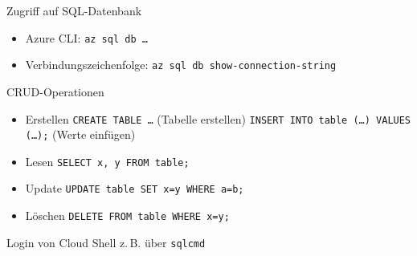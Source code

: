 \begin{flashcard}[Definition]{Zugriff auf SQL-Datenbank}
    \begin{itemize}
        \item Azure CLI: \texttt{az sql db \ldots}
        \item Verbindungszeichenfolge: \texttt{az sql db show-connection-string}
    \end{itemize}
\end{flashcard}



\begin{flashcard}[Definition]{CRUD-Operationen}
    \begin{itemize}
        \item Erstellen\newline
            \texttt{CREATE TABLE \ldots} (Tabelle erstellen)\newline
            \texttt{INSERT INTO table (\ldots) VALUES (\ldots);} (Werte einfügen)
        \item Lesen\newline
            \texttt{SELECT x, y FROM table;}
        \item Update\newline
            \texttt{UPDATE table SET x=y WHERE a=b;}
        \item Löschen\newline
            \texttt{DELETE FROM table WHERE x=y;}
    \end{itemize}
    Login von Cloud Shell z.\,B. über \texttt{sqlcmd}
\end{flashcard}
